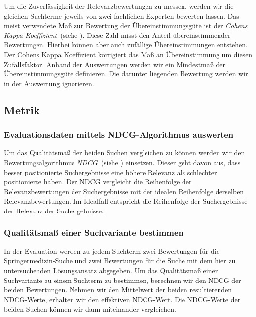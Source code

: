 Um die Zuverlässigkeit der Relevanzbewertungen zu messen, werden wir die gleichen Suchterme jeweils von zwei fachlichen Experten bewerten lassen. Das  meist verwendete  Maß  zur  Bewertung  der Übereinstimmungsgüte ist der \textit{Cohens Kappa Koeffizient}~(siehe \cite{Kappa}). Diese Zahl misst den  Anteil übereinstimmender Bewertungen. Hierbei können aber auch zufällige Übereinstimmungen entstehen. Der Cohens Kappa Koeffizient korrigiert das Maß an Übereinstimmung um diesen Zufallsfaktor. Anhand der Auswertungen werden wir ein Mindestmaß der Übereinstimmungsgüte definieren. Die darunter liegenden Bewertung werden wir in der Auswertung ignorieren. 

\subsection{Metrik}
\label{sec:Evaluation:Aufbau:Metrik}

\subsubsection{Evaluationsdaten mittels NDCG-Algorithmus auswerten}
\label{sec:Evaluation:Aufbau:Metrik:EvaluationsdatenNDCG}

Um das Qualitätsmaß der beiden Suchen vergleichen zu können werden wir den Bewertungsalgorithmus \textit{NDCG}~(siehe \cite{NDCG}) einsetzen. Dieser geht davon aus, dass besser positionierte Suchergebnisse eine höhere Relevanz als schlechter positionierte haben. Der NDCG vergleicht die Reihenfolge der Relevanzbewertungen der Suchergebnisse mit der idealen Reihenfolge derselben Relevanzbewertungen. Im Idealfall entspricht die Reihenfolge der Suchergebnisse der Relevanz der Suchergebnisse.

\subsubsection{Qualitätsmaß einer Suchvariante bestimmen}
\label{sec:Evaluation:Aufbau:Metrik:QualitaetMessen}

In der Evaluation werden zu jedem Suchterm zwei Bewertungen für die Springermedizin-Suche und zwei Bewertungen für die Suche mit dem hier zu untersuchenden Lösungsansatz abgegeben. Um das Qualitätsmaß einer Suchvariante zu einem Suchterm zu bestimmen, berechnen wir den NDCG der beiden Bewertungen. Nehmen wir den Mittelwert der beiden resultierenden NDCG-Werte, erhalten wir den effektiven NDCG-Wert. Die NDCG-Werte der beiden Suchen können wir dann miteinander vergleichen.

